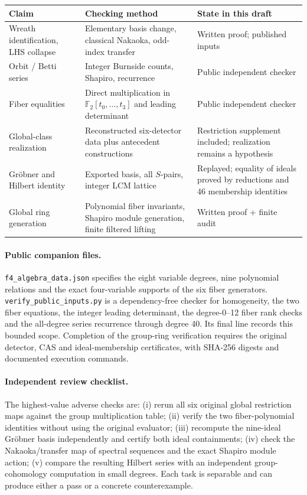 \documentclass[11pt,a4paper]{article}
\theoremstyle{remark}\newtheorem{remark}[theorem]{Remark}
\newcommand{\F}{\mathbb F}
\begin{document}
\begin{center}
\small
\begin{tabularx}{\linewidth}{@{}>{\raggedright\arraybackslash}p{23mm}X>{\raggedright\arraybackslash}p{28mm}@{}}
\toprule
\textbf{Claim}&\textbf{Checking method}&\textbf{State in this draft}\\ \midrule
Wreath identification, LHS collapse & Elementary basis change, classical Nakaoka, odd-index transfer & Written proof; published inputs\\
Orbit / Betti series & Integer Burnside counts, Shapiro, recurrence & Public independent checker\\
Fiber equalities & Direct multiplication in \(\F_2[t_0,\dots,t_3]\) and leading determinant & Public independent checker\\
Global-class realization & Reconstructed six-detector data plus antecedent constructions & Restriction supplement included; realization remains a hypothesis\\
Gr\"obner and Hilbert identity & Exported basis, all \(S\)-pairs, integer LCM lattice & Replayed; equality of ideals proved by reductions and 46 membership identities\\
Global ring generation & Polynomial fiber invariants, Shapiro module generation, finite filtered lifting & Written proof + finite audit\\
\bottomrule
\end{tabularx}
\end{center}

\paragraph{Public companion files.}
\texttt{f4\_algebra\_data.json} specifies the eight variable degrees, nine polynomial relations and the exact four-variable supports of the six fiber generators. \texttt{verify\_public\_inputs.py} is a dependency-free checker for homogeneity, the two fiber equations, the integer leading determinant, the degree-0--12 fiber rank checks and the all-degree series recurrence through degree 40. Its final line records this bounded scope. Completion of the group-ring verification requires the original detector, CAS and ideal-membership certificates, with SHA-256 digests and documented execution commands.

\paragraph{Independent review checklist.}
The highest-value adverse checks are: (i) rerun all six original global restriction maps against the group multiplication table; (ii) verify the two fiber-polynomial identities without using the original evaluator; (iii) recompute the nine-ideal Gr\"obner basis independently and certify both ideal containments; (iv) check the Nakaoka/transfer map of spectral sequences and the exact Shapiro module action; (v) compare the resulting Hilbert series with an independent group-cohomology computation in small degrees. Each task is separable and can produce either a pass or a concrete counterexample.
\end{document}
